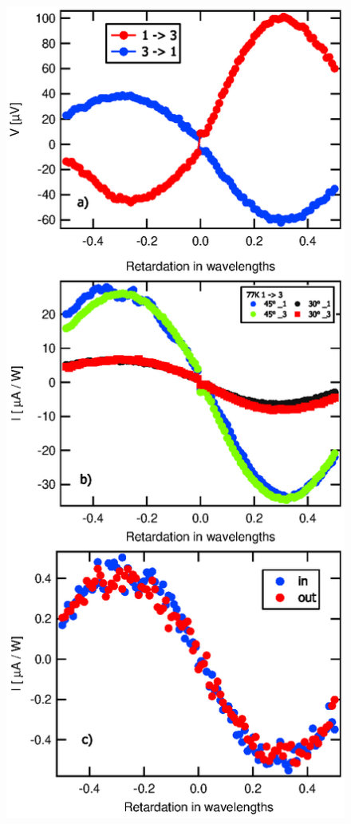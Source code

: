 \documentclass{article}
\begin{document}
\begin{figure}[htb]
\begin{center}
\includegraphics[scale=0.75]{fig4.eps}
\end{center}
\end{figure}
\end{document}
